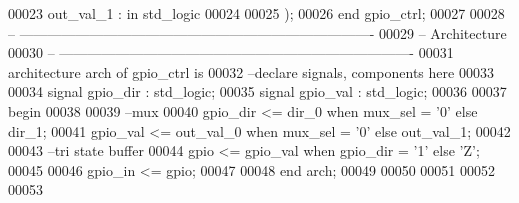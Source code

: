 \begin{DoxyCode}
00023         \textcolor{vhdlchar}{out_val_1}   \textcolor{vhdlchar}{:} \textcolor{keywordflow}{in} \textcolor{comment}{std\_logic}
00024 
00025         \textcolor{vhdlchar}{)};
00026 \textcolor{keywordflow}{end} \textcolor{vhdlchar}{gpio\_ctrl};
00027 
00028 \textcolor{keyword}{-- ----------------------------------------------------------------------------}
00029 \textcolor{keyword}{-- Architecture}
00030 \textcolor{keyword}{-- ----------------------------------------------------------------------------}
00031 \textcolor{keywordflow}{architecture} arch \textcolor{keywordflow}{of} gpio_ctrl is
00032 \textcolor{keyword}{--declare signals,  components here}
00033 
00034 \textcolor{keywordflow}{signal} \textcolor{vhdlchar}{gpio_dir} \textcolor{vhdlchar}{:} \textcolor{comment}{std\_logic};
00035 \textcolor{keywordflow}{signal} \textcolor{vhdlchar}{gpio_val} \textcolor{vhdlchar}{:} \textcolor{comment}{std\_logic};
00036  
00037 \textcolor{vhdlkeyword}{begin}
00038 
00039 \textcolor{keyword}{--mux}
00040 \textcolor{vhdlchar}{gpio_dir} \textcolor{vhdlchar}{<=} \textcolor{vhdlchar}{dir_0}       \textcolor{keywordflow}{when} \textcolor{vhdlchar}{mux_sel} \textcolor{vhdlchar}{=} \textcolor{vhdlchar}{'}\textcolor{vhdllogic}{}\textcolor{vhdllogic}{0}\textcolor{vhdlchar}{'} \textcolor{keywordflow}{else} \textcolor{vhdlchar}{dir_1};
00041 \textcolor{vhdlchar}{gpio_val} \textcolor{vhdlchar}{<=} \textcolor{vhdlchar}{out_val_0}   \textcolor{keywordflow}{when} \textcolor{vhdlchar}{mux_sel} \textcolor{vhdlchar}{=} \textcolor{vhdlchar}{'}\textcolor{vhdllogic}{}\textcolor{vhdllogic}{0}\textcolor{vhdlchar}{'} \textcolor{keywordflow}{else} \textcolor{vhdlchar}{out_val_1};
00042 
00043 \textcolor{keyword}{--tri state buffer}
00044 \textcolor{vhdlchar}{gpio}        \textcolor{vhdlchar}{<=} \textcolor{vhdlchar}{gpio_val} \textcolor{keywordflow}{when} \textcolor{vhdlchar}{gpio_dir} \textcolor{vhdlchar}{=} \textcolor{vhdlchar}{'}\textcolor{vhdllogic}{}\textcolor{vhdllogic}{1}\textcolor{vhdlchar}{'} \textcolor{keywordflow}{else} \textcolor{vhdlchar}{'}\textcolor{vhdlchar}{Z}\textcolor{vhdlchar}{'};
00045 
00046 \textcolor{vhdlchar}{gpio_in} \textcolor{vhdlchar}{<=} \textcolor{vhdlchar}{gpio};
00047   
00048 \textcolor{keywordflow}{end} \textcolor{vhdlchar}{arch};
00049 
00050 
00051 
00052 
00053 
\end{DoxyCode}
